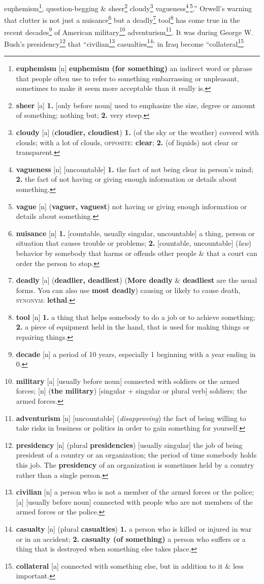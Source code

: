 \documentclass[oneside]{book}
\numberwithin{equation}{section}
\begin{document}
euphemism\footnote{\textbf{euphemism} [n] \textbf{euphemism (for something)} an indirect word or phrase that people often use to refer to something embarrassing or unpleasant, sometimes to make it seem more acceptable than it really is.}, question-begging \& sheer\footnote{\textbf{sheer} [a] \textbf{1.} [only before noun] used to emphasize the size, degree or amount of something; nothing but; \textbf{2.} very steep.} cloudy\footnote{\textbf{cloudy} [a] (\textbf{cloudier, cloudiest}) \textbf{1.} (of the sky or the weather) covered with clouds; with a lot of clouds, \textsc{opposite}: \textbf{clear}; \textbf{2.} (of liquids) not clear or transparent.} vagueness\footnote{\textbf{vagueness} [n] [uncountable] \textbf{1.} the fact of not being clear in person's mind; \textbf{2.} the fact of not having or giving enough information or details about something.}\,\footnote{\textbf{vague} [n] (\textbf{vaguer, vaguest}) not having or giving enough information or details about something.}.'' Orwell's warning that clutter is not just a nuisance\footnote{\textbf{nuisance} [n] \textbf{1.} [countable, usually singular, uncountable] a thing, person or situation that causes trouble or problems; \textbf{2.} [countable, uncountable] (\textit{law}) behavior by somebody that harms or offends other people \& that a court can order the person to stop.} but a deadly\footnote{\textbf{deadly} [a] (\textbf{deadlier, deadliest}) (\textbf{More deadly} \& \textbf{deadliest} are the usual forms. You can also use \textbf{most deadly}) causing or likely to cause death, \textsc{synonym}: \textbf{lethal}.} tool\footnote{\textbf{tool} [n] \textbf{1.} a thing that helps somebody to do a job or to achieve something; \textbf{2.} a piece of equipment held in the hand, that is used for making things or repairing things.} has come true in the recent decades\footnote{\textbf{decade} [n] a period of 10 years, especially 1 beginning with a year ending in 0.} of American military\footnote{\textbf{military} [a] [usually before noun] connected with soldiers or the armed forces; [n] (\textbf{the military}) [singular $+$ singular or plural verb] soldiers; the armed forces.} adventurism\footnote{\textbf{adventurism} [n] [uncountable] (\textit{disapproving}) the fact of being willing to take risks in business or politics in order to gain something for yourself.}. It was during George W. Bush's presidency\footnote{\textbf{presidency} [n] (plural \textbf{presidencies}) [usually singular] the job of being president of a country or an organization; the period of time somebody holds this job. The \textbf{presidency} of an organization is sometimes held by a country rather than a single person.} that ``civilian\footnote{\textbf{civilian} [n] a person who is not a member of the armed forces or the police; [a] [usually before noun] connected with people who are not members of the armed forces or the police.} casualties\footnote{\textbf{casualty} [n] (plural \textbf{casualties}) \textbf{1.} a person who is killed or injured in war or in an accident; \textbf{2.} \textbf{casualty (of something)} a person who suffers or a thing that is destroyed when something else takes place.}'  in Iraq become ``collateral\footnote{\textbf{collateral} [a] connected with something else, but in addition to it \& less important.} 
\end{document}
